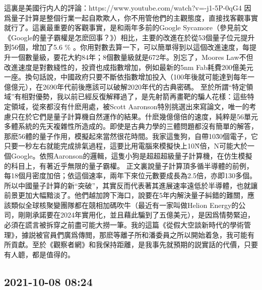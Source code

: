 \documentclass[twocolumn]{ctexart}
\begin{document}
這裏是美國行内人的評論：https://www.youtube.com/watch?v=-j1-5P-0qG4
因爲量子計算是整個行業一起自欺欺人，你不用管他們的主觀態度，直接找客觀事實就行了。這裏最重要的客觀事實，是和兩年多前的Google Sycamore（參見前文《Google的量子霸權是怎麽回事？》）相比，主要的改進在於從53個量子位元提升到56個，增加了5.6 \% 。你用對數去算一下，可以簡單得到以這個改進速度，每提升一個數量級，要花大約84年；8個數量級就是672年。別忘了，Moores Law不但改進速度是對數綫性的，投資也成指數增加，例如最新的5nm Fab耗費200億美元一座。換句話說，中國政府只要不斷依指數增加投入（100年後就可能達到每年一億億元），在2690年代前後應該可以破解2020年代的古典密碼。
至於所謂“特定領域”有相對優勢，我以前已經反復解釋過了，是先射箭再畫靶的騙人花樣：這些特定領域，從來都沒有什麽用處，被Scott Aaronson特別挑選出來寫論文，唯一的考慮只在於它們是量子計算機自然運作的結果。什麽幾億億倍的速度，純粹是56單元多體系統的先天複雜性所造成的。即使是古典力學的三體問題都沒有簡單的解答，那麽56體的量子作用，模擬起來當然很花時間。我家這隻狗，自帶10\^30個電子，它只要一秒左右就能完成排氣過程，這要比用電腦來模擬快上10\^N倍，N可能大於一個Google。依照Aaronson的邏輯，這隻小狗是超超超級量子計算機，在仿生模擬的科目上，有著近乎無限的量子霸權。
正文裏說量子計算頂多循半導體的前例，每18個月密度加倍；依這個速率，兩年下來位元數要成長為2.5倍，亦即130多個。所以中國量子計算的新“突破”，其實反而代表著其進展速率遠低於半導體，也就讓前景更加大幅黯淡了。他們越加誇下海口，說要在5年内解決量子糾錯的難關，應該類似全球核聚變團隊都在競相加碼吹牛（最近有一家叫做Helion Energy的公司，剛剛承諾要在2024年實用化，並且藉此騙到了五億美元），是因爲情勢緊迫，必須在謊言被拆穿之前盡可能大撈一筆。我的這篇《從假大空談新時代的學術管理》，據説被官員們廣爲傳閲，那麽等離子所和潘委員之所以開始着急，我可能有所貢獻。至於《觀察者網》和我保持距離，是我事先就預期的説實話的代價，只要有人聼，都是值得的。
\subsection*{2021-10-08 08:24}
\end{document}
